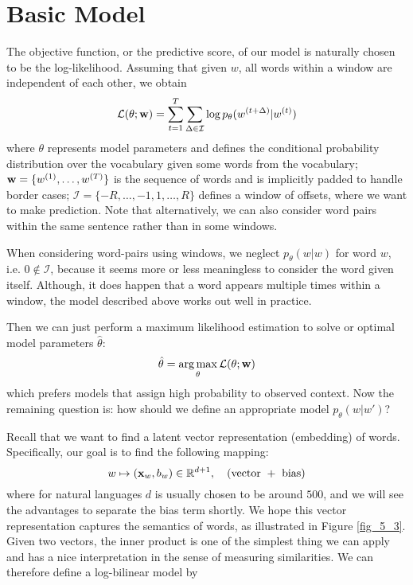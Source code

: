 \documentclass[../main.tex]{subfiles}
\begin{document}
\section{Basic Model}
The objective function, or the predictive score, of our model is naturally chosen to be the log-likelihood. Assuming that given $w$, all words within a window are independent of each other, we obtain
\begin{equation}\label{eq_5_log_l}
\mathcal{L}(\theta;{\bf w})=\sum_{t=1}^{T}\sum_{\Delta \in \mathcal{I}}\log p_{\theta}(w^{(t+\Delta)}|w^{(t)})
\end{equation} 
where $\theta$ represents model parameters and defines the conditional probability distribution over the vocabulary given some words from the vocabulary; ${\bf w}=\{w^{(1)},\dots,w^{(T)}\}$ is the sequence of words and is implicitly padded to handle border cases; $\mathcal{I}=\{-R,\dots,-1,1,\dots,R\}$ defines a window of offsets, where we want to make prediction. Note that alternatively, we can also consider word pairs within the same sentence rather than in some windows.
\begin{remark}
	When considering word-pairs using windows, we neglect $p_{\theta}(w|w)$ for word $w$, i.e. $0\notin \mathcal{I}$, because it seems more or less meaningless to consider the word given itself. Although, it does happen that a word appears multiple times within a window, the model described above works out well in practice.
\end{remark}
\par Then we can just perform a maximum likelihood estimation to solve or optimal model parameters $\hat{\theta}$:
\begin{equation*}
\hat{\theta} = \mathop{\arg\max}_{\theta}\mathcal{L}(\theta;{\bf w})
\end{equation*}
which prefers models that assign high probability to observed context. Now the remaining question is: how should we define an appropriate model $p_{\theta}(w|w')$? 
\par Recall that we want to find a latent vector representation (embedding) of words. Specifically, our goal is to find the following mapping:
\begin{equation*}
w \mapsto ({\bf x}_w,b_w)\in \mathbb{R}^{d+1},\quad (\text{vector }+\text{ bias})
\end{equation*}
where for natural languages $d$ is usually chosen to be around $500$, and we will see the advantages to separate the bias term shortly. We hope this vector representation captures the semantics of words, as illustrated in Figure \ref{fig_5_3}. Given two vectors, the inner product is one of the simplest thing we can apply and has a nice interpretation in the sense of measuring similarities. We can therefore define a log-bilinear model by
\end{document}
